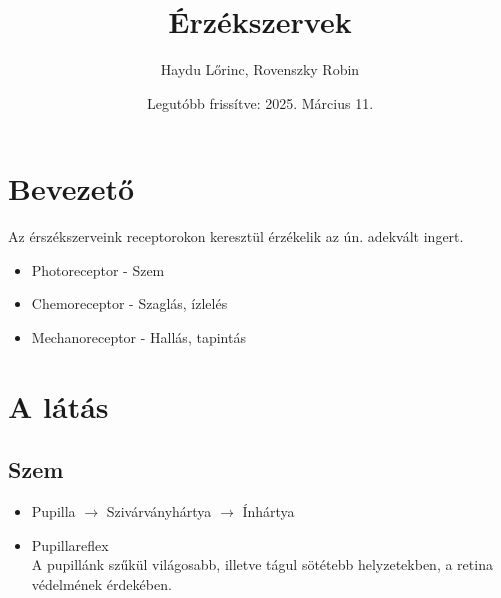 \documentclass{article}
\title{Érzékszervek}
\author{Haydu Lőrinc, Rovenszky Robin}
\date{Legutóbb frissítve: 2025. Március 11.}
\begin{document}
\maketitle
\section{Bevezető}
Az érszékszerveink receptorokon keresztül érzékelik az ún. adekvált ingert.

\begin{itemize}
    \item Photoreceptor - Szem
    \item Chemoreceptor - Szaglás, ízlelés
    \item Mechanoreceptor - Hallás, tapintás
\end{itemize}

\section{A látás}
\subsection{Szem}
\begin{itemize}
    \item Pupilla $\rightarrow$ Szivárványhártya $\rightarrow$ Ínhártya
    \item Pupillareflex\\ A pupillánk szűkül világosabb, illetve tágul sötétebb helyzetekben, a retina védelmének érdekében.
\end{itemize}
\end{document}
